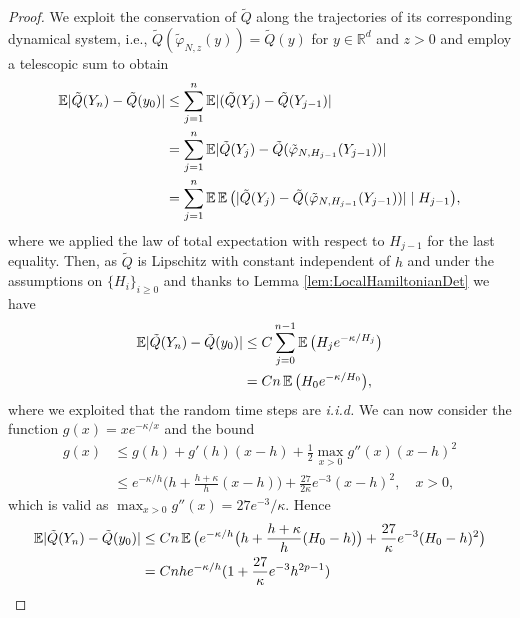 \documentclass{siamart1116}
\numberwithin{theorem}{section}
\DeclarePairedDelimiter{\abs}{\lvert}{\rvert}
\renewcommand{\phi}{\varphi}
\newcommand{\R}{\mathbb{R}}
\newcommand{\E}{\operatorname{\mathbb{E}}}
\begin{document}
\begin{proof} We exploit the conservation of $\tilde Q$ along the trajectories of its corresponding dynamical system, i.e., $\tilde Q (\tilde \phi_{N,z} (y)) = \tilde Q(y)$ for $y \in \R^d$ and $z > 0$ and employ a telescopic sum to obtain
\begin{equation}
\begin{aligned}
	\E \abs{\tilde Q(Y_n) - \tilde Q(y_0)} &\leq \sum_{j=1}^{n} \E\abs{(\tilde Q(Y_{j}) - \tilde Q(Y_{j-1})} \\
	&= \sum_{j=1}^{n} \E \abs{\tilde Q(Y_j) - \tilde Q(\tilde\phi_{N, H_{j-1}}(Y_{j-1}))} \\
	&= \sum_{j=1}^{n} \E\E\big(\abs{\tilde Q(Y_j) - \tilde Q (\tilde\phi_{N, H_{j-1}}(Y_{j-1}))} \mid H_{j-1}\big),
\end{aligned}
\end{equation}
where we applied the law of total expectation with respect to $H_{j-1}$ for the last equality. Then, as $\tilde Q$ is Lipschitz with constant independent of $h$ and under the assumptions on $\{H_i\}_{i\geq 0}$ and thanks to Lemma \ref{lem:LocalHamiltonianDet} we have
\begin{equation}
\begin{aligned}
\E \abs{\tilde Q(Y_n) - \tilde Q(y_0)} &\leq C \sum_{j=0}^{n-1} \E\big(H_{j}e^{-\kappa/H_j}\big)\\
&= C n \E\big(H_0e^{-\kappa/H_0}\big),
\end{aligned}
\end{equation}
where we exploited that the random time steps are \textit{i.i.d.} We can now consider the function $g(x) = xe^{-\kappa/x}$ and the bound
\begin{equation}
\begin{aligned}
	g(x) &\leq g(h) + g'(h) (x - h) + \frac{1}{2} \max_{x>0} g''(x) (x - h)^2 \\
	&\leq e^{-\kappa/h} \big(h + \frac{h + \kappa}{h}(x-h)\big) + \frac{27}{2\kappa}e^{-3} (x-h)^2, \quad x > 0,
\end{aligned}
\end{equation}
which is valid as $\max_{x>0} g''(x) = 27e^{-3}/\kappa$. Hence
\begin{equation}\label{eq:ErrorModifHamiltonian}
\begin{aligned}
\E \abs{\tilde Q(Y_n) - \tilde Q(y_0)} &\leq Cn \E\big( e^{-\kappa/h} \big(h + \frac{h + \kappa}{h}(H_0-h)\big) + \frac{27}{\kappa}e^{-3} (H_0-h)^2 \big) \\
&= Cnhe^{-\kappa/h}(1 + \frac{27}{\kappa}e^{-3} h^{2p-1}) \\

\end{aligned}
\end{equation}
\end{proof}
\end{document}
